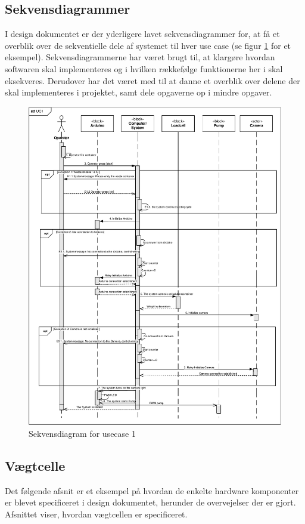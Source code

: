 \subsection{Sekvensdiagrammer}
I design dokumentet er der yderligere lavet sekvensdiagrammer for, at få et overblik over de sekventielle dele af systemet til hver use case (se figur \ref{fig:sekvendisgr} for et eksempel). Sekvensdiagrammerne har været brugt til, at klargøre hvordan softwaren skal implementeres og i hvilken rækkefølge funktionerne her i skal eksekveres. Derudover har det været med til at danne et overblik over delene der skal implementeres i projektet, samt    dele opgaverne op i mindre opgaver.
\begin{figure}[H]
	\centering
	\includegraphics[width=1\textwidth]{pdf/UC1_cropped.pdf}
	\caption{Sekvensdiagram for usecase 1}
	\label{fig:sekvendisgr}
\end{figure}


\subsection{Vægtcelle}
Det følgende afsnit er et eksempel på hvordan de enkelte hardware komponenter er blevet specificeret i design dokumentet, herunder de overvejelser der er gjort. Afsnittet viser, hvordan vægtcellen er specificeret.

